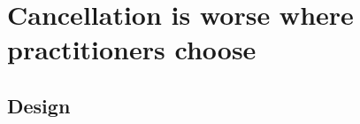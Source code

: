 %
%
%

\section{Cancellation is worse where practitioners choose}
\label{sec:minigrid}

\subsection{Design}

